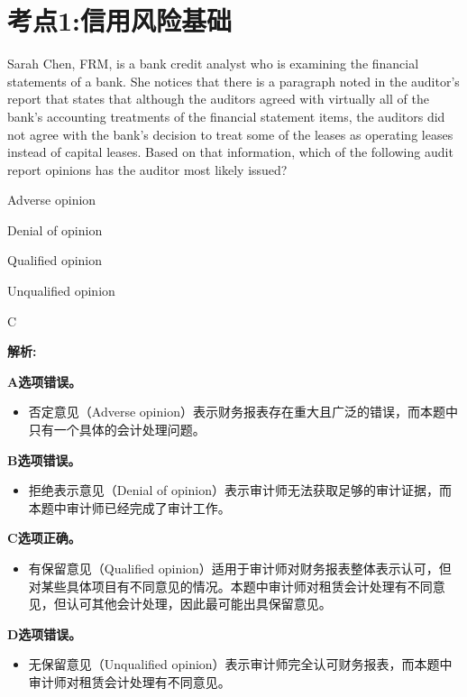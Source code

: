 \documentclass{article}
\newcounter{question} %
\newenvironment{explanation}
{\textbf{解析:}\par}
{\par}
\begin{document}
 \tableofcontents %
\newpage




\section{考点1:信用风险基础}
\setcounter{question}{0}


\begin{question}
    Sarah Chen, FRM, is a bank credit analyst who is examining the financial statements of a bank. She notices that there is a paragraph noted in the auditor's report that states that although the auditors agreed with virtually all of the bank's accounting treatments of the financial statement items, the auditors did not agree with the bank's decision to treat some of the leases as operating leases instead of capital leases. Based on that information, which of the following audit report opinions has the auditor most likely issued?
\end{question}

\begin{choices}
    \item Adverse opinion
    \item Denial of opinion
    \item Qualified opinion
    \item Unqualified opinion
\end{choices}

\begin{correctanswer}
    C
\end{correctanswer}

\begin{explanation}
    \textbf{A选项错误。}
    \begin{itemize}
        \item 否定意见（Adverse opinion）表示财务报表存在重大且广泛的错误，而本题中只有一个具体的会计处理问题。
    \end{itemize}
    
    \textbf{B选项错误。}
    \begin{itemize}
        \item 拒绝表示意见（Denial of opinion）表示审计师无法获取足够的审计证据，而本题中审计师已经完成了审计工作。
    \end{itemize}
    
    \textbf{C选项正确。}
    \begin{itemize}
        \item 有保留意见（Qualified opinion）适用于审计师对财务报表整体表示认可，但对某些具体项目有不同意见的情况。本题中审计师对租赁会计处理有不同意见，但认可其他会计处理，因此最可能出具保留意见。
    \end{itemize}
    
    \textbf{D选项错误。}
    \begin{itemize}
        \item 无保留意见（Unqualified opinion）表示审计师完全认可财务报表，而本题中审计师对租赁会计处理有不同意见。
    \end{itemize}
\end{explanation}
\end{document}
